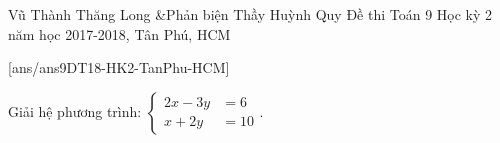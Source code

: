 \begin{name}
{Vũ Thành Thăng Long \&Phản biện Thầy Huỳnh Quy}
{Đề thi Toán 9 Học kỳ 2 năm học 2017-2018, Tân Phú, HCM}
\end{name}
\setcounter{ex}{0}
[ans/ans9DT18-HK2-TanPhu-HCM]
\begin{ex}%
	Giải hệ phương trình: $\begin{cases}
	2x-3y&=6\\
	x+2y&=10
	\end{cases}$.
\end{ex}


